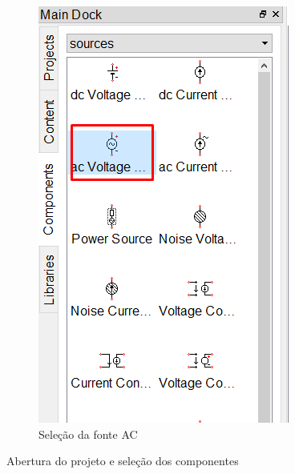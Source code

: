 \begin{figure}[H]
\begin{subfigure}{.4\textwidth}
        \includegraphics[width=.7\textwidth,  trim={0 7cm 0 0}, clip]{imagens/CircuitoA/fonto_ac.png}
        \caption{Seleção da fonte AC}
        \label{fig:new_proj}
    \end{subfigure}

    \caption{Abertura do projeto e seleção dos componentes }
\end{figure}

